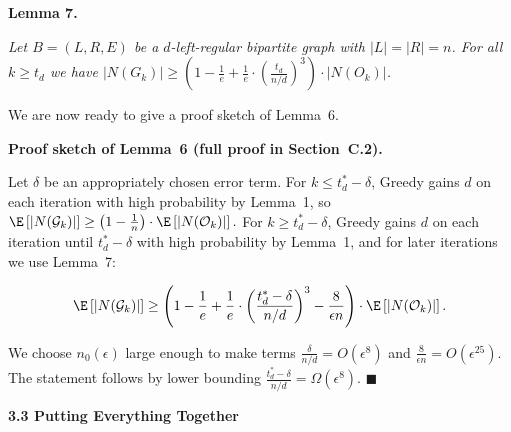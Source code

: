 

\par\medskip\noindent\textbf{\textbf{Lemma 7}\textbf{.}}\par



\emph{Let $B=(L,R,E)$ be a $d$-left-regular bipartite graph with $|L|=|R|=n$.
For all $k\geq t_{d}$ we have $|N(G_{k})|\geq\left(1-\frac{1}{e}+\frac{1}{e}\cdot\left(\frac{t_{d}}{n/d}\right)^{3}\right)\cdot|N(O_{k})|$.}\par






We are now ready to give a proof sketch of Lemma 6.\par




\par\medskip\noindent\textbf{Proof sketch of Lemma 6 (full proof in Section C.2).}\par



Let $\delta$ be an appropriately chosen error term. For $k\leq t^{*}_{d}-\delta$, Greedy gains $d$ on each iteration with high probability by Lemma 1, so
$\E\left[|N(\mathcal{G}_{k})|\right]\geq\left(1-\frac{1}{n}\right)\cdot\E\left[|N(\mathcal{O}_{k})|\right].$ For $k\geq t^{*}_{d}-\delta$, Greedy gains $d$ on each iteration until $t^{*}_{d}-\delta$ with high probability by Lemma 1, and for later iterations we use Lemma 7:\par


\[\begin{gathered}
\displaystyle\E\left[|N(\mathcal{G}_{k})|\right]\geq\left(1-\frac{1}{e}+\frac{1}{e}\cdot\left(\frac{t^{*}_{d}-\delta}{n/d}\right)^{3}-\frac{8}{\epsilon n}\right)\cdot\E\left[|N(\mathcal{O}_{k})|\right].
\end{gathered}\]


We choose $n_{0}(\epsilon)$ large enough to make terms $\frac{\delta}{n/d}=O(\epsilon^{8})$ and $\frac{8}{\epsilon n}=O(\epsilon^{25})$.
The statement follows by lower bounding $\frac{t^{*}_{d}-\delta}{n/d}=\Omega(\epsilon^{8})$.
\ensuremath{\blacksquare}\par







\par\medskip\noindent\textbf{3.3 Putting Everything Together}\par




